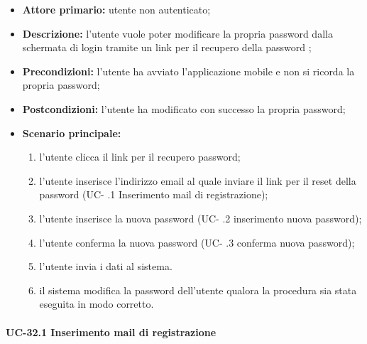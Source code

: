	\begin{itemize}
		\item \textbf{Attore primario:} utente non autenticato;

		\item \textbf{Descrizione:} l'utente vuole poter modificare la propria password dalla schermata di login tramite un link per il recupero della password ;

		\item \textbf{Precondizioni:} l'utente ha avviato l'applicazione mobile e non si ricorda la propria password;

		\item \textbf{Postcondizioni:} l'utente ha modificato con successo la propria password;

		\item \textbf{Scenario principale:}
	  		\begin{enumerate}
		  		\item l'utente clicca il link per il recupero password; 
		  		\item l'utente inserisce l'indirizzo email al quale inviare il link per il reset della password (UC- .1 Inserimento mail di registrazione);
		  		\item l'utente inserisce la nuova password (UC- .2 inserimento nuova password);
		  		\item l'utente conferma la nuova password (UC- .3 conferma nuova password);
		  		\item l'utente invia i dati al sistema.
		  		\item il sistema modifica la password dell'utente qualora la procedura sia stata eseguita in modo corretto.
	  		\end{enumerate}
	\end{itemize}

\paragraph{UC-32.1 Inserimento mail di registrazione}

